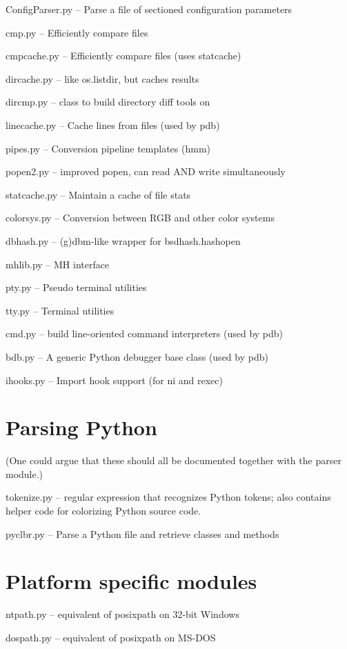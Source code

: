 ConfigParser.py -- Parse a file of sectioned configuration parameters

cmp.py -- Efficiently compare files

cmpcache.py -- Efficiently compare files (uses statcache)

dircache.py -- like os.listdir, but caches results

dircmp.py -- class to build directory diff tools on

linecache.py -- Cache lines from files (used by pdb)

pipes.py -- Conversion pipeline templates (hmm)

popen2.py -- improved popen, can read AND write simultaneously

statcache.py -- Maintain a cache of file stats

colorsys.py -- Conversion between RGB and other color systems

dbhash.py -- (g)dbm-like wrapper for bsdhash.hashopen

mhlib.py -- MH interface

pty.py -- Pseudo terminal utilities

tty.py -- Terminal utilities

cmd.py -- build line-oriented command interpreters (used by pdb)

bdb.py -- A generic Python debugger base class (used by pdb)

ihooks.py -- Import hook support (for ni and rexec)


\section{Parsing Python}

(One could argue that these should all be documented together with the
parser module.)

tokenize.py -- regular expression that recognizes Python tokens; also
contains helper code for colorizing Python source code.

pyclbr.py -- Parse a Python file and retrieve classes and methods


\section{Platform specific modules}

ntpath.py -- equivalent of posixpath on 32-bit Windows

dospath.py -- equivalent of posixpath on MS-DOS



